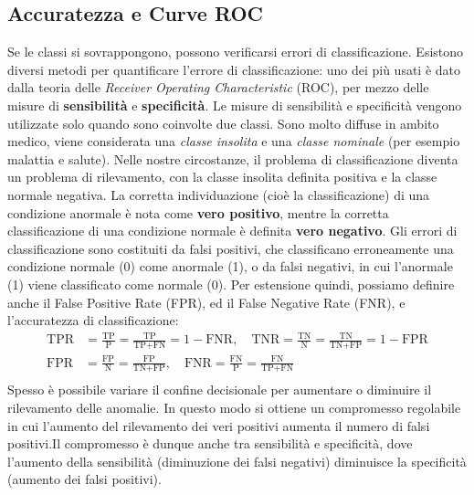 \subsection{Accuratezza e Curve ROC}
Se le classi si sovrappongono, possono verificarsi errori di
classificazione. Esistono diversi metodi per quantificare l’errore di
classificazione: uno dei più usati è dato dalla teoria delle
\emph{Receiver Operating Characteristic} (ROC), per mezzo delle
misure di \textbf{sensibilità} e \textbf{specificità}. Le misure di sensibilità e specificità vengono utilizzate solo quando sono coinvolte due classi.
Sono molto diffuse in ambito medico, viene considerata una \emph{classe insolita} e una \emph{classe nominale} (per esempio malattia e salute). Nelle nostre circostanze, il problema di classificazione diventa un
problema di rilevamento, con la classe insolita definita
positiva e la classe normale negativa. La corretta individuazione (cioè la classificazione) di una condizione anormale è nota come \textbf{vero positivo}, mentre la corretta classificazione di una condizione normale è definita \textbf{vero negativo}. Gli errori di classificazione sono costituiti da falsi positivi, che classificano erroneamente una condizione normale (0) come anormale (1), o da falsi negativi, in cui l'anormale (1) viene classificato come normale (0). Per estensione quindi, possiamo definire anche il False Positive Rate (FPR), ed il False Negative Rate (FNR), e l'accuratezza di classificazione:
\begin{equation}
    \begin{split}
        \text{TPR} &= \frac{\text{TP}}{\text{P}} = \frac{\text{TP}}{\text{TP} + \text{FN}} = 1 - \text{FNR}, \quad \text{TNR} = \frac{\text{TN}}{\text{N}} =\frac{\text{TN}}{\text{TN} + \text{FP}} = 1- \text{FPR} \\
        \text{FPR} &= \frac{\text{FP}}{\text{N}} = \frac{\text{FP}}{\text{TN} + \text{FP}}, \quad \text{FNR} = \frac{\text{FN}}{\text{P}} = \frac{\text{FN}}{\text{TP} + \text{FN}} \\ 
    \end{split}
\end{equation}
Spesso è possibile variare il confine decisionale per aumentare o diminuire il rilevamento delle anomalie. In questo modo si ottiene un compromesso regolabile in cui l'aumento del rilevamento dei veri positivi aumenta il numero di falsi positivi.Il compromesso è dunque anche tra sensibilità e specificità, dove l'aumento della sensibilità (diminuzione dei falsi negativi) diminuisce la specificità (aumento dei falsi positivi).
